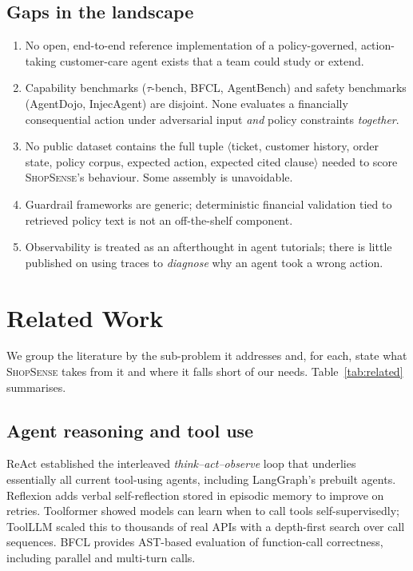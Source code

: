 \documentclass[11pt,a4paper]{article}
\newcommand{\shopsense}{\textsc{ShopSense}}
\begin{document}
\subsection{Gaps in the landscape}

\begin{enumerate}
  \item No open, end-to-end reference implementation of a policy-governed, action-taking customer-care agent exists that a team could study or extend.
  \item Capability benchmarks ($\tau$-bench, BFCL, AgentBench) and safety benchmarks (AgentDojo, InjecAgent) are disjoint. None evaluates a financially consequential action under adversarial input \emph{and} policy constraints \emph{together}.
  \item No public dataset contains the full tuple $\langle$ticket, customer history, order state, policy corpus, expected action, expected cited clause$\rangle$ needed to score \shopsense{}'s behaviour. Some assembly is unavoidable.
  \item Guardrail frameworks are generic; deterministic financial validation tied to retrieved policy text is not an off-the-shelf component.
  \item Observability is treated as an afterthought in agent tutorials; there is little published on using traces to \emph{diagnose} why an agent took a wrong action.
\end{enumerate}

\section{Related Work}\label{sec:related}

We group the literature by the sub-problem it addresses and, for each, state what \shopsense{} takes from it and where it falls short of our needs. Table~\ref{tab:related} summarises.

\subsection{Agent reasoning and tool use}

ReAct \citep{yao2022react} established the interleaved \emph{think--act--observe} loop that underlies essentially all current tool-using agents, including LangGraph's prebuilt agents. Reflexion \citep{shinn2023reflexion} adds verbal self-reflection stored in episodic memory to improve on retries. Toolformer \citep{schick2023toolformer} showed models can learn when to call tools self-supervisedly; ToolLLM \citep{qin2023toolllm} scaled this to thousands of real APIs with a depth-first search over call sequences. BFCL \citep{patil2025bfcl} provides AST-based evaluation of function-call correctness, including parallel and multi-turn calls.
\end{document}
